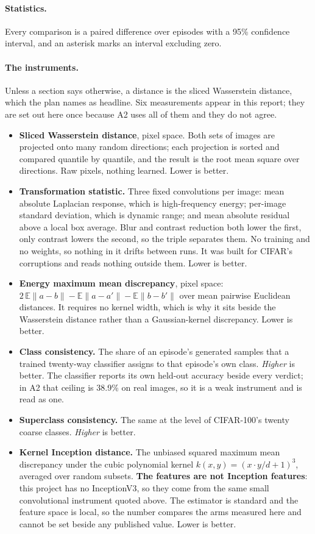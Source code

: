 \documentclass{article}
\begin{document}
\paragraph{Statistics.} Every comparison is a paired difference over episodes with a 95\%
confidence interval, and an asterisk marks an interval excluding zero.

\paragraph{The instruments.} Unless a section says otherwise, a distance is the sliced
Wasserstein distance, which the plan names as headline. Six measurements appear in this
report; they are set out here once because A2 uses all of them and they do not agree.

\begin{itemize}\itemsep1pt \parskip0pt
\item \textbf{Sliced Wasserstein distance}, pixel space. Both sets of images are projected
onto many random directions; each projection is sorted and compared quantile by quantile,
and the result is the root mean square over directions. Raw pixels, nothing learned. Lower
is better.
\item \textbf{Transformation statistic.} Three fixed convolutions per image: mean absolute
Laplacian response, which is high-frequency energy; per-image standard deviation, which is
dynamic range; and mean absolute residual above a local box average. Blur and contrast
reduction both lower the first, only contrast lowers the second, so the triple separates
them. No training and no weights, so nothing in it drifts between runs. It was built for
CIFAR's corruptions and reads nothing outside them. Lower is better.
\item \textbf{Energy maximum mean discrepancy}, pixel space:
$2\,\mathbb{E}\|a-b\| - \mathbb{E}\|a-a'\| - \mathbb{E}\|b-b'\|$ over mean pairwise
Euclidean distances. It requires no kernel width, which is why it sits beside the
Wasserstein distance rather than a Gaussian-kernel discrepancy. Lower is better.
\item \textbf{Class consistency.} The share of an episode's generated samples that a trained
twenty-way classifier assigns to that episode's own class. \emph{Higher} is better. The
classifier reports its own held-out accuracy beside every verdict; in A2 that ceiling is
38.9\% on real images, so it is a weak instrument and is read as one.
\item \textbf{Superclass consistency.} The same at the level of CIFAR-100's twenty coarse
classes. \emph{Higher} is better.
\item \textbf{Kernel Inception distance.} The unbiased squared maximum mean discrepancy
under the cubic polynomial kernel $k(x,y) = (x\!\cdot\!y/d + 1)^{3}$, averaged over random
subsets. \textbf{The features are not Inception features}: this project has no InceptionV3,
so they come from the same small convolutional instrument quoted above. The estimator is
standard and the feature space is local, so the number compares the arms measured here and
cannot be set beside any published value. Lower is better.
\end{itemize}
\end{document}
